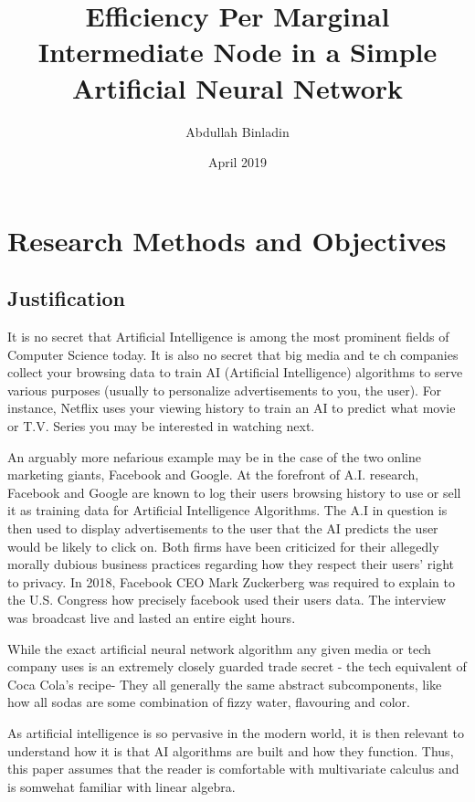 \documentclass[12pt]{article}
\title{Efficiency Per Marginal Intermediate Node in a Simple Artificial Neural Network}
\author{Abdullah Binladin}
\date{April 2019}
\begin{document}
\maketitle

\tableofcontents
\pagebreak

\section{Research Methods and Objectives}

\subsection{Justification\label{history}}

It is no secret that Artificial Intelligence is among the most prominent fields of Computer Science today. It is also no secret that big media and te
ch companies collect your browsing data to train AI (Artificial Intelligence) algorithms to serve various purposes (usually to personalize advertisements to you, the user). For instance, Netflix uses your viewing history to train an AI to predict what movie or T.V. Series you may be interested in watching next.

An arguably more nefarious example may be in the case of the two online marketing giants, Facebook and Google. At the forefront of A.I. research, Facebook and Google are known to log their users browsing history to use or sell it as training data for Artificial Intelligence Algorithms. The A.I in question is then used to display advertisements to the user that the AI predicts the user would be likely to click on. Both firms have been criticized for their allegedly morally dubious business practices regarding how they respect their users' right to privacy. In 2018, Facebook CEO Mark Zuckerberg was required to explain to the U.S. Congress how precisely facebook used their users data. The interview was broadcast live and lasted an entire eight hours.

While the exact artificial neural network algorithm any given media or tech company uses is an extremely closely guarded trade secret - the tech equivalent of Coca Cola's recipe- They all generally the same abstract subcomponents, like how all sodas are some combination of fizzy water, flavouring and color.

As artificial intelligence is so pervasive in the modern world, it is then relevant to understand how it is that AI algorithms are built and how they function. Thus, this paper assumes that the reader is comfortable with multivariate calculus and is somwehat familiar with linear algebra.
\end{document}
